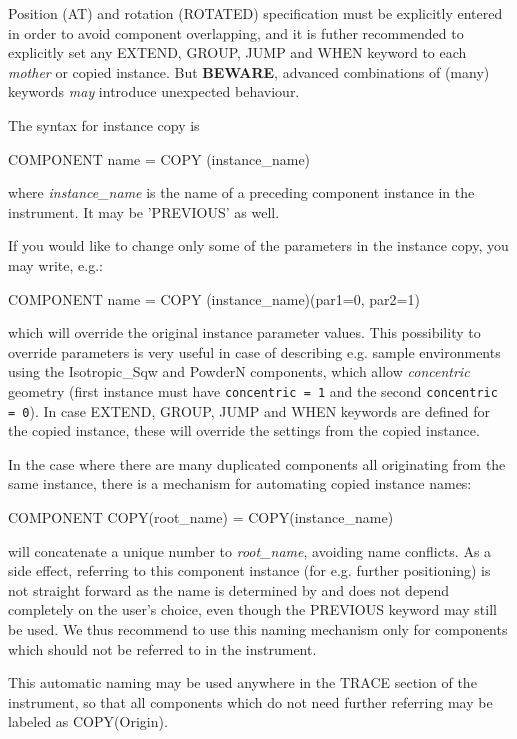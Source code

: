 Position (AT) and rotation (ROTATED) specification must
be explicitly entered in order to avoid component overlapping, and it
is futher recommended to explicitly set any EXTEND, GROUP, JUMP and
WHEN keyword to each \emph{mother} or copied instance. But {\bf BEWARE},
advanced combinations of (many) keywords \emph{may} introduce
unexpected behaviour.

The syntax for instance copy is
\begin{mcstas}
COMPONENT name = COPY (instance_name)
\end{mcstas}
where \textit{instance\_name} is the name of a preceding component instance in the
instrument. It may be 'PREVIOUS' as well.

If you would like to change only some of the parameters in the instance copy, you may write, e.g.:

\begin{mcstas}
COMPONENT name = COPY (instance_name)(par1=0, par2=1)
\end{mcstas}

which will override the original instance parameter values. This possibility to
override parameters is very useful in case of describing e.g. sample environments
using the Isotropic\_Sqw and PowderN components, which allow \emph{concentric}
geometry (first instance must have \verb+concentric = 1+ and the second
\verb+concentric = 0+). In case EXTEND, GROUP, JUMP and WHEN keywords are
defined for the copied instance, these will override the settings from the
copied instance.


In the case where there are many duplicated components all originating from the
same instance, there is a mechanism for automating copied instance names:
\begin{mcstas}
COMPONENT COPY(root_name) = COPY(instance_name)
\end{mcstas}
will concatenate a unique number to \textit{root\_name}, avoiding name
conflicts. As a side effect, referring to this component instance (for
e.g. further positioning) is not straight forward as the name is determined by
\mcs and does not depend completely on the user's choice, even though the
PREVIOUS keyword may still be used. We thus recommend to use this naming
mechanism only for components which should not be referred to in the instrument.

This automatic naming may be used anywhere in the TRACE section of the
instrument, so that all components which do not need further referring may be
labeled as COPY(Origin).

